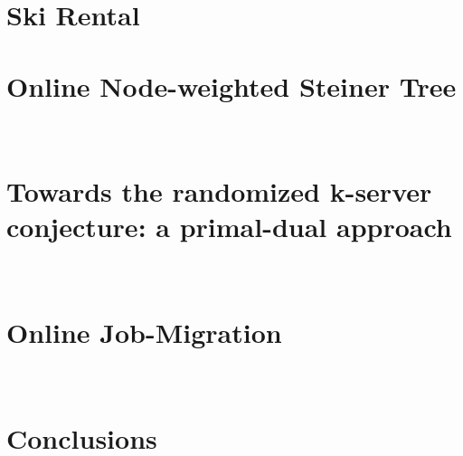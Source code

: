 \documentclass[10pt]{article}
\begin{document}
\section{Ski Rental}

\section{Online Node-weighted Steiner Tree}
~\cite{naor11:node-weighted-steiner-tree}

\section{Towards the randomized k-server conjecture: a primal-dual approach}
~\cite{bansal10:k-server}

\section{Online Job-Migration}
~\cite{buchbinder11:job-migration} ~\cite{buchbinder11:job-migration-techreport}

\section{Conclusions}



\end{document}
